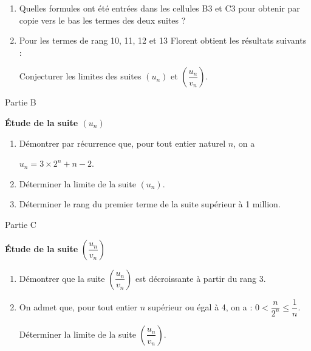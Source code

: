 \begin{center}
\end{center} 
\begin{enumerate}
     \item
     Quelles formules ont été entrées dans les cellules B3 et C3 pour obtenir par copie vers le bas les termes des deux suites ?
     \item
     Pour les termes de rang 10, 11, 12 et 13 Florent obtient les résultats suivants :
\begin{center}
\end{center} 
     Conjecturer les limites des suites $\left(u_n\right)$ et $\left(\dfrac{u_n}{v_n} \right)$.
\end{enumerate}
\begin{h3}Partie B\end{h3}
\textbf{Étude de la suite  $\left(u_n\right)$}
\begin{enumerate}
     \item
     Démontrer par récurrence que, pour tout entier naturel $n$, on a
     \par
     $u_n = 3 \times  2^n+n-2$.
     \item
     Déterminer la limite de la suite $\left(u_n\right)$.
     \item
     Déterminer le rang du premier terme de la suite supérieur à 1 million.
\end{enumerate}
\begin{h3}Partie C\end{h3}
\textbf{Étude de la suite } $\left(\dfrac{u_n}{v_n} \right)$
\begin{enumerate}
     \item
     Démontrer que la suite $\left(\dfrac{u_n}{v_n} \right)$ est décroissante à partir du rang 3.
     \item
     On admet que, pour tout entier $n$ supérieur ou égal  à 4, on a : $0 < \dfrac{n}{2^n} \leqslant \dfrac{1}{n}$.
     \par
     Déterminer la limite de la suite $\left(\dfrac{u_n}{v_n} \right)$.
\end{enumerate}
